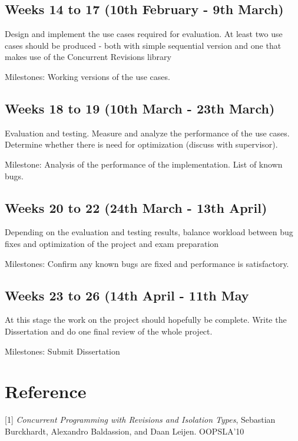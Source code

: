\subsection*{Weeks 14 to 17 (10th February - 9th March)}

Design and implement the use cases required for evaluation. At least two use cases should be produced - both with simple sequential version and one that makes use of the Concurrent Revisions library 

Milestones: Working versions of the use cases.


\subsection*{Weeks 18 to 19 (10th March - 23th March)}

Evaluation and testing. Measure and analyze the performance of the use cases. Determine whether there is need for optimization (discuss with supervisor).

Milestone: Analysis of the performance of the implementation. List of known bugs.


\subsection*{Weeks 20 to 22 (24th March - 13th April)}

Depending on the evaluation and testing results, balance workload between bug fixes and optimization of the project and exam preparation

Milestones: Confirm any known bugs are fixed and performance is satisfactory.


\subsection*{Weeks 23 to 26 (14th April - 11th May}

At this stage the work on the project should hopefully be complete. Write the Dissertation and do one final review of the whole project.

Milestones: Submit Dissertation



\section*{Reference}
\begin{description}
\item{[1]} \emph{Concurrent Programming with Revisions and Isolation Types}, Sebastian Burckhardt, Alexandro Baldassion, and Daan Leijen. OOPSLA'10

\end{description}

